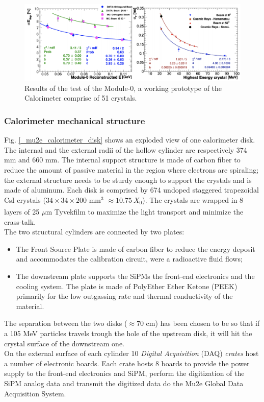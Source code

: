 \documentclass[12pt,a4paper,openright, oneside, titlepage]{book} %
\begin{document}
\begin{figure}[h!]
\centering
\includegraphics[scale=0.5]{calorimeter_test}
\caption[Calorimeter prototype results]{Results of the test of the Module-0, a working prototype of the Calorimeter comprise of 51 crystals. \cite{Donghia:2019} \cite{Calorimeter:2020}}
\label{_calorimeter_test}
\end{figure}


\subsubsection{Calorimeter mechanical structure}
Fig. \ref{_mu2e_calorimeter_disk} shows an exploded view of one calorimeter disk.
The internal and the external radii of the hollow cylinder are respectively 374 mm and 660 mm.
The internal support structure is made of carbon fiber to reduce the amount of passive material in the region where electrons are spiraling; the external structure needs to be sturdy enough to support the crystals and is made of aluminum. 
Each disk is comprised by 674 undoped staggered trapezoidal CsI crystals ($34\times34\times200$ mm$^3$  $\approx10.75\ X_0$). The crystals are wrapped in 8 layers of 25 $\mu$m Tyvek\textsuperscript \textregistered film to maximize the light transport and minimize the crass-talk. \\
The two structural cylinders are connected by two plates:
\begin{itemize}
\item The Front Source Plate is made of carbon fiber to reduce the energy deposit and accommodates the calibration circuit, were a radioactive fluid flows;
\item The downstream plate supports the SiPMs the front-end electronics and the cooling system. 
The plate is made of PolyEther Ether Ketone (PEEK) primarily for the low outgassing rate and thermal conductivity of the material.
\end{itemize} 
The separation between the two disks ($\approx 70$ cm) has been chosen to be so that if a 105 MeV particles travels trough the hole of the upstream disk, it will hit the crystal surface of the downstream one.\\
On the external surface of each cylinder 10 \textit{Digital Acquisition }(DAQ) \textit{crates} host a number of electronic boards.
Each crate hosts 8 boards to provide the power supply to the front-end electronics and SiPM, perform the digitization of the SiPM analog data and transmit the digitized data do the Mu2e Global Data Acquisition System.
\end{document}

